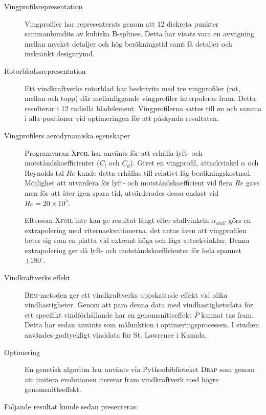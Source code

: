 \begin{description}
  \item[Vingprofilsrepresentation] Vingprofiler har representerats genom att 12 diskreta punkter sammanbundits av kubiska B-splines. Detta har visats vara en avvägning mellan mycket detaljer och hög beräkningstid samt få detaljer och inskränkt designrymd.
  \item[Rotorbladssrepresentation] Ett vindkraftverks rotorblad har beskrivits med tre vingprofiler (rot, mellan och topp) där mellanliggande vingprofiler interpoleras fram. Detta resulterar i 12 radiella bladelement. Vingprofilerna sattes till en och samma i alla positioner vid optimeringen för att påskynda resultaten. 
  

  \item[Vingprofilers aerodynamiska egenskaper] Programvaran \textsc{Xfoil} har använts för att erhålla lyft- och motståndskoefficienter ($C_l$ och $C_d$). Givet en vingprofil, attackvinkel $\alpha$ och Reynolds tal $Re$ kunde detta erhållas till relativt låg beräkningskostnad. Möjlighet att utvärdera för lyft- och motståndskoefficient vid flera $Re$ gavs men för att åter igen spara tid, utvärderades dessa endast vid $Re = 20\times10^5$.
  
Eftersom \textsc{Xfoil} inte kan ge resultat långt efter stallvinkeln $\alpha_{stall}$ görs en extrapolering med viternaekvationerna, det antas även att vingprofilen beter sig som en platta vid extremt höga och låga attackvinklar. Denna extrapolering ger då lyft- och motståndskoefficienter för hela spannet $\pm 180^{\circ}$.
  
  
  
  \item[Vindkraftverks effekt] \textsc{Bem}-metoden ger ett vindkraftverks uppskattade effekt vid olika vindhastigheter. Genom att para denna data med vindhastighetsdata för ett specifikt vindförhållande har en genomsnittseffekt $\overline{P}$ kunnat tas fram. Detta har sedan använts som målunktion i optimeringsprocessen. I studien användes godtyckligt vinddata för St. Lawrence i Kanada.
  
  \item[Optimering] En genetisk algoritm har använts via Pythonbiblioteket \textsc{Deap} som genom att imitera evolutionen itererar fram vindkraftverk med högre genomsnittseffekt.
  
\end{description}

Följande resultat kunde sedan presenteras:

